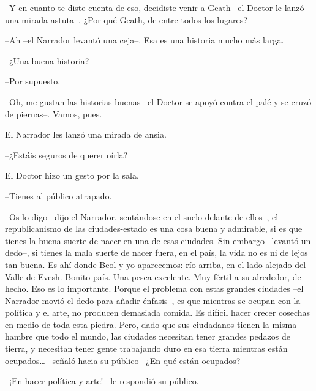 {--Y en cuanto te diste cuenta de eso, decidiste venir a Geath --el
	Doctor le lanzó una mirada astuta--. ¿Por qué Geath, de entre todos los
lugares?}

{--Ah --el Narrador levantó una ceja--. Esa es una historia mucho más
larga.}

{--¿Una buena historia?}

{--Por supuesto.}

{--Oh, me gustan las historias buenas --el Doctor se apoyó contra el
palé y se cruzó de piernas--. Vamos, pues.}

{El Narrador les lanzó una mirada de ansia.}

{--¿Estáis seguros de querer oírla?}

{El Doctor hizo un gesto por la sala.}

{--Tienes al público atrapado.}

{--Os lo digo --dijo el Narrador, sentándose en el suelo delante de
	ellos--, el republicanismo de las ciudades-estado es una cosa buena y
	admirable, si es que tienes la buena suerte de nacer en una de esas
	ciudades. Sin embargo --levantó un dedo--, si tienes la mala suerte de
	nacer fuera, en el país, la vida no es ni de lejos tan buena. Es ahí
	donde Beol y yo aparecemos: río arriba, en el lado alejado del Valle de
	Evesh. Bonito país. Una pesca excelente. Muy fértil a su alrededor, de
	hecho. Eso es lo importante. Porque el problema con estas grandes
	ciudades --el Narrador movió el dedo para añadir énfasis--, es que
	mientras se ocupan con la política y el arte, no producen demasiada
	comida. Es difícil hacer crecer cosechas en medio de toda esta piedra.
	Pero, dado que sus ciudadanos tienen la misma hambre que todo el mundo,
	las ciudades necesitan tener grandes pedazos de tierra, y necesitan
	tener gente trabajando duro en esa tierra mientras están
	ocupados\ldots{} --señaló hacia su público-- ¿En qué están ocupados?}

{--¡En hacer política y arte! --le respondió su público.}

